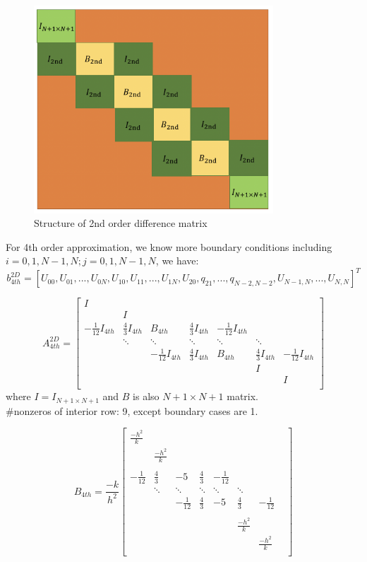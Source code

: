 \documentclass[a4paper]{article}
\begin{document}
\begin{figure}
\centering
\includegraphics[width=0.8\textwidth]{2nd.png}
\caption{\label{2nd}Structure of 2nd order difference matrix}
\end{figure}

For 4th order approximation, we know more boundary conditions including $i=0,1,N-1,N;j=0,1,N-1,N$, we have:
$$b_{4th}^{2D} = [U_{00}, U_{01},..., U_{0N}, U_{10}, U_{11},...,U_{1N},U_{20},q_{21},...,q_{N-2,N-2},U_{N-1,N},...,U_{N,N} ]^T $$

\[
A_{4th}^{2D}
= 
\begin{bmatrix}
     I &  &   &   &  &\\
      &I &   &   &  &\\
    -\frac{1}{12}I_{4th}& \frac{4}{3}I_{4th} & B_{4th} & \frac{4}{3}I_{4th} & -\frac{1}{12}I_{4th} \\
      &\ddots& \ddots & \ddots & \ddots & \ddots& \\
     &&-\frac{1}{12}I_{4th}& \frac{4}{3}I_{4th} & B_{4th} & \frac{4}{3}I_{4th} & -\frac{1}{12}I_{4th} \\
     & & & & &    I \\
     & & &  & &  &  I  \\
\end{bmatrix}
\]
where $I=I_{N+1\times N+1}$ and $B$ is also $N+1 \times N+1$ matrix.\\
\#nonzeros of interior row: 9, except boundary cases are 1.

\[
B_{4th}
= \frac{-k}{h^2}
\begin{bmatrix}
     \frac{-h^2}{k} \\
    & \frac{-h^2}{k}\\\\
    -\frac{1}{12}  & \frac{4}{3}  & -5 & \frac{4}{3}  & - \frac{1}{12} & &&\\
    
     & \ddots& \ddots & \ddots & \ddots & \ddots & \\
    
    && -\frac{1}{12}  & \frac{4}{3}  & -5 & \frac{4}{3}  & - \frac{1}{12} \\\\
    &&&&& \frac{-h^2}{k} \\
    &&&&&& \frac{-h^2}{k} \\
\end{bmatrix}
\]
\end{document}
